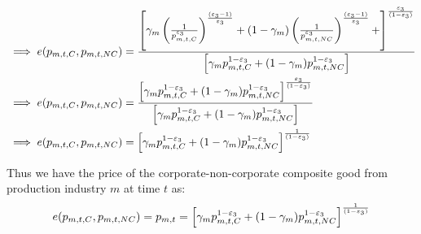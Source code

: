 \begin{equation}
\begin{split}
&\implies e(p_{m,t,C},p_{m,t,NC}) = 
\frac{\left[\gamma_{m}\left( \frac{1}{p_{m,t,C}^{\varepsilon_{3}}}\right)^{\frac{(\varepsilon_{3}-1)}{\varepsilon_{3}}}+(1-\gamma_{m})\left(\frac{1}{p_{m,t,NC}^{\varepsilon_{3}}}\right)^{\frac{(\varepsilon_{3}-1)}{\varepsilon_{3}}}+\right]^{\frac{\varepsilon_{3}}{(1-\varepsilon_{3})}}}{\left[\gamma_{m}p_{m,t,C}^{1-\varepsilon_{3}}+(1-\gamma_{m})p_{m,t,NC}^{1-\varepsilon_{3}}\right]}\\
&\implies e(p_{m,t,C},p_{m,t,NC}) = 
\frac{\left[\gamma_{m}p_{m,t,C}^{1-\varepsilon_{3}}+(1-\gamma_{m})p_{m,t,NC}^{1-\varepsilon_{3}}\right]^{\frac{\varepsilon_{3}}{(1-\varepsilon_{3})}}}{\left[\gamma_{m}p_{m,t,C}^{1-\varepsilon_{3}}+(1-\gamma_{m})p_{m,t,NC}^{1-\varepsilon_{3}}\right]}\\
&\implies e(p_{m,t,C},p_{m,t,NC}) = 
\left[\gamma_{m}p_{m,t,C}^{1-\varepsilon_{3}}+(1-\gamma_{m})p_{m,t,NC}^{1-\varepsilon_{3}}\right]^{\frac{1}{(1-\varepsilon_{3})}}\\
\end{split}
\end{equation}   

\noindent\noindent Thus we have the price of the corporate-non-corporate composite good from production industry $m$ at time $t$ as:
\begin{equation}
 e(p_{m,t,C},p_{m,t,NC})=p_{m,t}=\left[\gamma_{m}p_{m,t,C}^{1-\varepsilon_{3}}+(1-\gamma_{m})p_{m,t,NC}^{1-\varepsilon_{3}}\right]^{\frac{1}{(1-\varepsilon_{3})}}
 \end{equation}
 


    
    